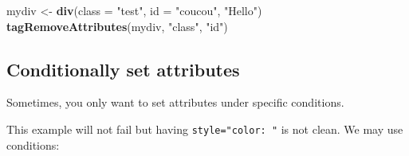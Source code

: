 \documentclass[]{book}
\newenvironment{Shaded}{\begin{snugshade}}{\end{snugshade}}
\newcommand{\ControlFlowTok}[1]{\textcolor[rgb]{0.13,0.29,0.53}{\textbf{#1}}}
\newcommand{\DataTypeTok}[1]{\textcolor[rgb]{0.13,0.29,0.53}{#1}}
\newcommand{\KeywordTok}[1]{\textcolor[rgb]{0.13,0.29,0.53}{\textbf{#1}}}
\newcommand{\NormalTok}[1]{#1}
\newcommand{\OperatorTok}[1]{\textcolor[rgb]{0.81,0.36,0.00}{\textbf{#1}}}
\newcommand{\OtherTok}[1]{\textcolor[rgb]{0.56,0.35,0.01}{#1}}
\newcommand{\StringTok}[1]{\textcolor[rgb]{0.31,0.60,0.02}{#1}}
\begin{document}
\begin{Shaded}
\begin{Highlighting}[]
\NormalTok{mydiv <-}\StringTok{ }\KeywordTok{div}\NormalTok{(}\DataTypeTok{class =} \StringTok{"test"}\NormalTok{, }\DataTypeTok{id =} \StringTok{"coucou"}\NormalTok{, }\StringTok{"Hello"}\NormalTok{)}
\KeywordTok{tagRemoveAttributes}\NormalTok{(mydiv, }\StringTok{"class"}\NormalTok{, }\StringTok{"id"}\NormalTok{)}
\end{Highlighting}
\end{Shaded}

\hypertarget{conditionally-set-attributes}{%
\subsection{Conditionally set attributes}\label{conditionally-set-attributes}}

Sometimes, you only want to set attributes under specific conditions.

\begin{Shaded}
\end{Shaded}

This example will not fail but having \texttt{style="color:\ "} is not clean. We may use conditions:

\begin{Shaded}
\end{Shaded}
\end{document}
